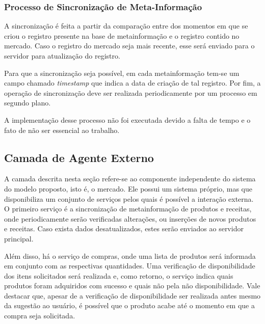 \subsubsection{Processo de Sincronização de Meta-Informação}

A sincronização é feita a partir da comparação entre dos momentos em que se criou o registro presente na base de metainformação e o registro contido no mercado. Caso o registro do mercado seja mais recente, esse será enviado para o servidor para atualização do registro. 

Para que a sincronização seja possível, em cada metainformação tem-se um campo chamado  \textit{timestamp} que indica a data de criação de tal registro.
Por fim, a operação de sincronização deve ser realizada periodicamente por um processo em segundo plano.

A implementação desse processo não foi executada devido a falta de tempo e o fato de não ser essencial ao trabalho.


\subsection{Camada de Agente Externo}

A camada descrita nesta seção refere-se ao componente independente do sistema do modelo proposto, isto é, o mercado. Ele possui um sistema próprio, mas que disponibiliza um conjunto de serviços pelos quais é possível a interação externa. O primeiro serviço é a sincronização de metainformação de produtos e receitas, onde periodicamente serão verificadas alterações, ou inserções de novos produtos e receitas. Caso exista dados desatualizados, estes serão enviados ao servidor principal.

Além disso, há o serviço de compras, onde uma lista de produtos será informada em conjunto com as respectivas quantidades. Uma verificação de disponibilidade dos itens solicitados será realizada e, como retorno, o serviço indica quais produtos foram adquiridos com sucesso e quais não pela não disponibilidade. Vale destacar que, apesar de a verificação de disponibilidade ser realizada antes mesmo da sugestão ao usuário, é possível que o produto acabe até o momento em que a compra seja solicitada.



